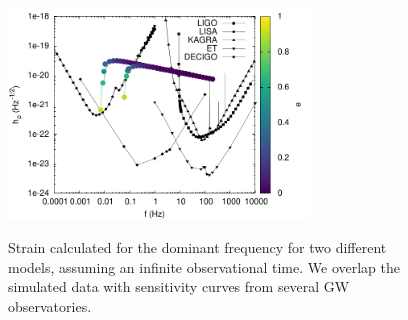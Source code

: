 \documentclass[twocolumn]{aastex62}
\begin{document}
\begin{figure}
\centering
\includegraphics[width=8cm]{strain_n21}\\
\caption{Strain calculated for the dominant frequency for two different models, assuming an infinite observational time. We overlap the simulated data with sensitivity curves from several GW observatories.}
\label{F12}
\end{figure}
\end{document}
